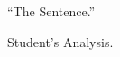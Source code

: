 


\begin{flushleft}
\thetitle

\thedate

\theauthor
\end{flushleft}

``The Sentence.''  %

Student's Analysis.

